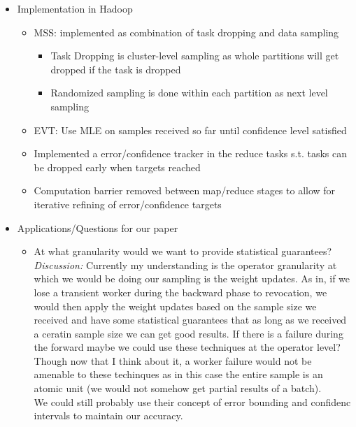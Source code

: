 \begin{itemize}
    \item Implementation in Hadoop
    \begin{itemize}
        \item MSS: implemented as combination of task dropping and data
          sampling
        \begin{itemize}
            \item Task Dropping is cluster-level sampling as whole partitions
              will get dropped if the task is dropped
            \item Randomized sampling is done within each partition as next
              level sampling
        \end{itemize}
        \item EVT: Use MLE on samples received so far until confidence level
          satisfied
        \item Implemented a error/confidence tracker in the reduce tasks s.t.
          tasks can be dropped early when targets reached
        \item Computation barrier removed between map/reduce stages to allow
          for iterative refining of error/confidence targets
    \end{itemize}

    \item Applications/Questions for our paper
    \begin{itemize}
        \item At what granularity would we want to provide statistical
          guarantees? \\
        \emph{Discussion:} Currently my understanding is the operator
        granularity at which we would be doing our sampling is the weight
        updates.
        As in, if we lose a transient worker during the backward phase to
        revocation, we would then apply the weight updates based on the sample
        size we received and have some statistical guarantees that as long as
        we received a ceratin sample size we can get good results.
        If there is a failure during the forward maybe we could use these
        techniques at the operator level? Though now that I think about it, a
        worker failure would not be amenable to these techinques as in this case
        the entire sample is an atomic unit (we would not somehow get partial
        results of a batch). \\
        We could still probably use their concept of error bounding and
        confidenc intervals to maintain our accuracy.

    \end{itemize}

\end{itemize}
